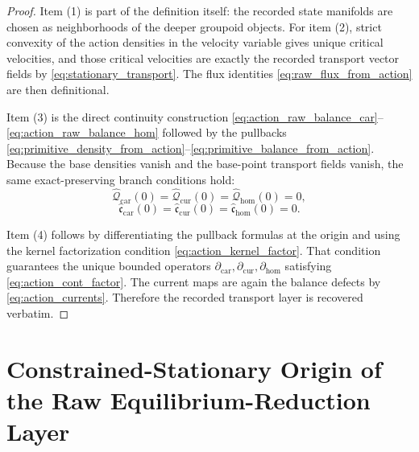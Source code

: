 \documentclass[11pt]{article}
\newcommand{\TensorCont}{\partial_{\mathrm{car}}}
\newcommand{\CurCont}{\partial_{\mathrm{cur}}}
\newcommand{\HomCont}{\partial_{\mathrm{hom}}}
\newcommand{\TensorPrimitiveDensity}{\widehat{\mathcal Q}_{\mathrm{car}}}
\newcommand{\CurPrimitiveDensity}{\widehat{\mathcal Q}_{\mathrm{cur}}}
\newcommand{\HomPrimitiveDensity}{\widehat{\mathcal Q}_{\mathrm{hom}}}
\newcommand{\TensorBalance}{\widehat{\mathfrak c}_{\mathrm{car}}}
\newcommand{\CurBalance}{\widehat{\mathfrak c}_{\mathrm{cur}}}
\newcommand{\HomBalance}{\widehat{\mathfrak c}_{\mathrm{hom}}}
\begin{document}
\begin{proof}
Item (1) is part of the definition itself: the recorded state manifolds are chosen as neighborhoods of the deeper groupoid objects. For item (2), strict convexity of the action densities in the velocity variable gives unique critical velocities, and those critical velocities are exactly the recorded transport vector fields by \eqref{eq:stationary_transport}. The flux identities \eqref{eq:raw_flux_from_action} are then definitional.

Item (3) is the direct continuity construction \eqref{eq:action_raw_balance_car}--\eqref{eq:action_raw_balance_hom} followed by the pullbacks \eqref{eq:primitive_density_from_action}--\eqref{eq:primitive_balance_from_action}. Because the base densities vanish and the base-point transport fields vanish, the same exact-preserving branch conditions hold:
\[
\TensorPrimitiveDensity(0)=\CurPrimitiveDensity(0)=\HomPrimitiveDensity(0)=0,
\]
\[
\TensorBalance(0)=\CurBalance(0)=\HomBalance(0)=0.
\]

Item (4) follows by differentiating the pullback formulas at the origin and using the kernel factorization condition \eqref{eq:action_kernel_factor}. That condition guarantees the unique bounded operators \(\TensorCont,\CurCont,\HomCont\) satisfying \eqref{eq:action_cont_factor}. The current maps are again the balance defects by \eqref{eq:action_currents}. Therefore the recorded transport layer is recovered verbatim.
\end{proof}

\section{Constrained-Stationary Origin of the Raw Equilibrium-Reduction Layer}
\end{document}
